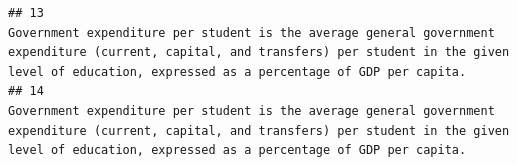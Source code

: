\documentclass[
]{article}
\begin{document}
\begin{verbatim}
## 13                                                                                                                                                                                                                                                                                                                                                                                                                                                                                                                                                                                                                                                                                                                                                                                                                                                                                                                                                                                                                                                                                                                                                                                                                                      Government expenditure per student is the average general government expenditure (current, capital, and transfers) per student in the given level of education, expressed as a percentage of GDP per capita.
## 14                                                                                                                                                                                                                                                                                                                                                                                                                                                                                                                                                                                                                                                                                                                                                                                                                                                                                                                                                                                                                                                                                                                                                                                                                                      Government expenditure per student is the average general government expenditure (current, capital, and transfers) per student in the given level of education, expressed as a percentage of GDP per capita.

\end{verbatim}
\end{document}
